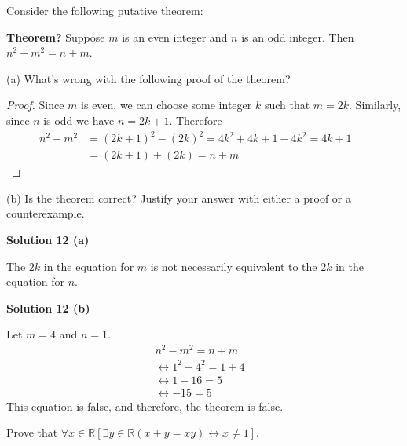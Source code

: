 \begin{tcolorbox}[title=Problem 12, breakable]
    Consider the following putative theorem:

    \textbf{Theorem?} Suppose $m$ is an even integer and $n$ is an odd integer.
    Then $n^2 - m^2 = n + m$.

    (a) What's wrong with the following proof of the theorem?
    \begin{proof}
        Since $m$ is even, we can choose some integer $k$ such that 
        $m = 2k$. Similarly, since $n$ is odd we have $n = 2k + 1$. Therefore 
        \begin{align*}
            n^2 - m^2 & = (2k + 1)^2 - (2k)^2 = 4k^2 + 4k + 1 - 4k^2 = 4k + 1 &  & \\
                      & = (2k + 1) + (2k) = n + m
        \end{align*}
    \end{proof}
    (b) Is the theorem correct? Justify your answer with either a proof 
    or a counterexample.
\end{tcolorbox}

\textbf{Solution 12 (a)}

The $2k$ in the equation for $m$ is not necessarily equivalent to the $2k$ in
the equation for $n$.

\textbf{Solution 12 (b)}

Let $m = 4$ and $n = 1$.
\begin{align*}
     & n^2 - m^2 = n + m                 &  & \\
     & \leftrightarrow 1^2 - 4^2 = 1 + 4 &  & \\
     & \leftrightarrow 1 - 16 = 5        &  & \\
     & \leftrightarrow -15 = 5
\end{align*}
This equation is false, and therefore, the theorem is false.

\begin{tcolorbox}[title=Problem 13, breakable]
    Prove that $\forall{x \in \mathbb{R}}[\exists{y \in \mathbb{R}}(x + y = xy) \leftrightarrow x \not = 1]$.
\end{tcolorbox}

